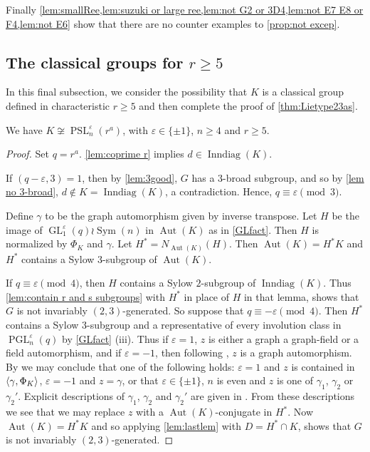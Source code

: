 \documentclass[12pt,a4paper]{amsart}
\DeclareMathOperator{\Aut}{Aut}
\DeclareMathOperator{\Inndiag}{Inndiag}
\DeclareMathOperator{\GL}{GL}
\DeclareMathOperator{\PGL}{PGL}
\DeclareMathOperator{\PSL}{PSL}
\DeclareMathOperator{\Sym}{Sym}
\renewcommand{\epsilon}{\varepsilon}
\newcommand{\eps}{\epsilon}
\DeclarePairedDelimiter{\gen}{\langle}{\rangle}
\begin{document}
Finally \cref{lem:smallRee,lem:suzuki or large ree,lem:not G2 or 3D4,lem:not E7 E8 or F4,lem:not E6} show that there are no   counter examples  to  \cref{prop:not excep}.



\subsection{The classical groups   for $r\ge 5$}


In this final subsection, we consider the possibility that $K$ is a classical group defined in characteristic $r\ge 5$ and then complete the proof of \cref{thm:Lietype23as}.


\begin{lemma}\label{GLGone} We have  $K \not \cong \PSL_n^\eps(r^a)$, with $\eps \in \{\pm 1\}$, $n \ge 4$ and $r\ge 5$.
\end{lemma}

\begin{proof} Set $q=r^a$.  \cref{lem:coprime r} implies  $d\in \Inndiag(K)$.

If $(q-\epsilon,3)=1$, then by \cref{lem:3good}, $G$ has a $3$-broad subgroup, and so by \cref{lem no 3-broad}, $d\not\in K=\Inndiag(K)$, a contradiction.
Hence, $q\equiv \eps\pmod 3$.

Define $\gamma$ to be the graph automorphism given by inverse transpose. Let   $H$  be the image of $\GL^{\epsilon}_1(q) \wr \Sym(n)$ in $\Aut(K)$ as in \cref{GLfact}.  Then $H$ is normalized by $\Phi_K$ and $\gamma$. Let $H^*= N_{\Aut(K)}(H)$. Then $\Aut(K)=H^*K$ and $H^*$ contains a Sylow $3$-subgroup of $\Aut(K)$.

If  $q\equiv \epsilon \pmod 4$, then $H$ contains a Sylow $2$-subgroup of $\Inndiag(K)$.
Thus \cref{lem:contain r and s subgroups}  with $ H^*$ in place of $H$ in that lemma, shows that $G$ is not invariably $(2,3)$-generated. So suppose that  $q\equiv -\epsilon \pmod 4$. Then $H^*$ contains a Sylow $3$-subgroup and a representative of every involution class in $\PGL_n^\eps(q)$ by \cref{GLfact} (iii).
Thus if $\epsilon=1$,  $z$  is either a graph   a graph-field  or a field automorphism, and if $\epsilon=-1$, then following \cite{GLS3}, $z$ is a graph automorphism. By   \cite[Table 4.5.1]{GLS3} we may conclude that one of the following holds: $\epsilon=1$ and $z$ is contained in $\gen{\gamma,\Phi_K}$, $\epsilon=-1$ and $z =\gamma$, or that $\epsilon\in\{\pm1\}$, $n$ is even and   $z$ is one of  $\gamma_1$, $\gamma_2$ or $\gamma_2'$. Explicit descriptions of $\gamma_1$, $\gamma_2$ and $\gamma_2'$ are given in \cite[Section 3.2.5 and Proposition 3.2.11]{BurnessGiudici}. From these descriptions we see that we may replace $z$ with a $\Aut(K)$-conjugate in $H^*$.
Now $\Aut(K)= H^*K$ and so applying \cref{lem:lastlem} with $D= H^*\cap K$, shows that $G$ is not invariably $(2,3)$-generated.
 \end{proof}
\end{document}
